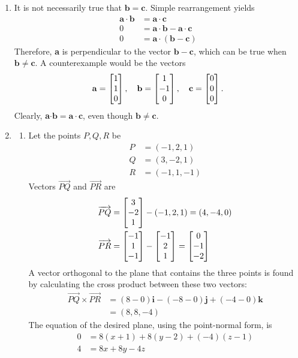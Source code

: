 \documentclass{article}
\begin{document}
\begin{enumerate}
\item
It is not necessarily true that $\mathbf{b}=\mathbf{c}$. Simple rearrangement yields
\begin{align*}
\mathbf{a}\cdot\mathbf{b}&=\mathbf{a}\cdot\mathbf{c} \\
0 &=\mathbf{a}\cdot\mathbf{b} - \mathbf{a}\cdot\mathbf{c} \\
0 &=\mathbf{a}\cdot (\mathbf{b} - \mathbf{c})
\end{align*}
Therefore, \textbf{a} is perpendicular to the vector $\mathbf{b} - \mathbf{c}$, which can be true when $\mathbf{b} \ne \mathbf{c}$.  A counterexample would be the vectors
\begin{align*}
\mathbf{a} = \begin{bmatrix} 1 \\ 1 \\ 0 \end{bmatrix} ,  \quad \mathbf{b} = \begin{bmatrix} 1 \\ -1 \\ 0 \end{bmatrix} , \quad  \mathbf{c} = \begin{bmatrix} 0 \\ 0 \\ 0 \end{bmatrix} .
\end{align*}
Clearly, \textbf{a}$\cdot\mathbf{b}=\mathbf{a}\cdot\mathbf{c}$, even though $\mathbf{b} \ne \mathbf{c}$.  

\item
\begin{enumerate}
\item
Let the points $P, Q, R$ be \\
\begin{align*}
P &=(-1,2,1)\\
Q &=(3,-2,1)\\
R &=(-1,1,-1)
\end{align*}
Vectors  $\overrightarrow{PQ}$ and $\overrightarrow{PR}$ are
\begin{align*}
\overrightarrow{PQ} &= \begin{bmatrix} 3 \\ -2 \\ 1 \end{bmatrix} -(-1,2,1) = (4,-4,0)\\
\overrightarrow{PR} &= \begin{bmatrix} -1 \\ 1 \\ -1 \end{bmatrix} - \begin{bmatrix} -1 \\ 2 \\ 1 \end{bmatrix} = \begin{bmatrix} 0 \\ -1 \\ -2\end{bmatrix}
\end{align*}
A vector orthogonal to the plane that contains the three points is found by calculating the cross product between these two vectors:
\begin{align*}
\overrightarrow{PQ} \times \overrightarrow{PR} 
&= (8-0)\mathbf{i} - (-8-0)\mathbf{j}+(-4-0)\mathbf{k} \\
&=(8,8,-4)
\end{align*}
The equation of the desired plane, using the point-normal form, is
\begin{align*}
0&=8(x+1)+8(y-2)+(-4)(z-1)\\
4&=8x + 8y -4z
\end{align*}


\end{enumerate}
\end{enumerate}
\end{document}
